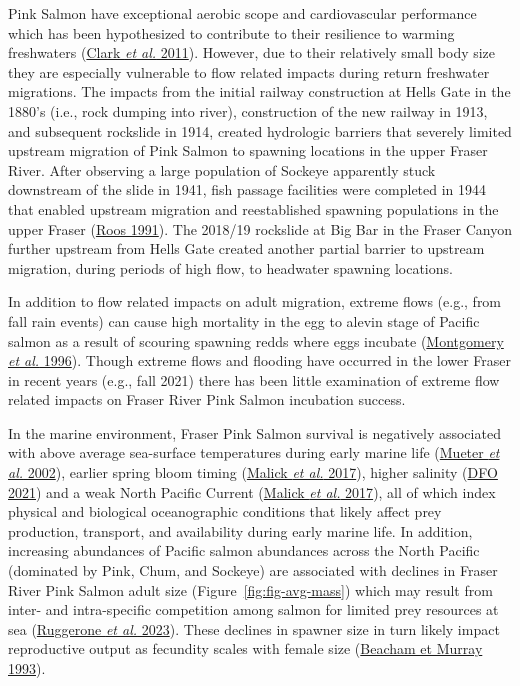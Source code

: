 \documentclass[french,11pt]{book}
\begin{document}
Pink Salmon have exceptional aerobic scope and cardiovascular performance which has been hypothesized to contribute to their resilience to warming freshwaters (\protect\hyperlink{ref-clarkExceptionalAerobicScope2011}{Clark \emph{et al.} 2011}). However, due to their relatively small body size they are especially vulnerable to flow related impacts during return freshwater migrations. The impacts from the initial railway construction at Hells Gate in the 1880's (i.e., rock dumping into river), construction of the new railway in 1913, and subsequent rockslide in 1914, created hydrologic barriers that severely limited upstream migration of Pink Salmon to spawning locations in the upper Fraser River. After observing a large population of Sockeye apparently stuck downstream of the slide in 1941, fish passage facilities were completed in 1944 that enabled upstream migration and reestablished spawning populations in the upper Fraser (\protect\hyperlink{ref-roosRestoringFraserRiver1991}{Roos 1991}). The 2018/19 rockslide at Big Bar in the Fraser Canyon further upstream from Hells Gate created another partial barrier to upstream migration, during periods of high flow, to headwater spawning locations.

In addition to flow related impacts on adult migration, extreme flows (e.g., from fall rain events) can cause high mortality in the egg to alevin stage of Pacific salmon as a result of scouring spawning redds where eggs incubate (\protect\hyperlink{ref-montgomeryStreambedScourEgg1996}{Montgomery \emph{et al.} 1996}). Though extreme flows and flooding have occurred in the lower Fraser in recent years (e.g., fall 2021) there has been little examination of extreme flow related impacts on Fraser River Pink Salmon incubation success.

In the marine environment, Fraser Pink Salmon survival is negatively associated with above average sea-surface temperatures during early marine life (\protect\hyperlink{ref-mueterOppositeEffectsOcean2002}{Mueter \emph{et al.} 2002}), earlier spring bloom timing (\protect\hyperlink{ref-malickEffectsNorthPacific2017}{Malick \emph{et al.} 2017}), higher salinity (\protect\hyperlink{ref-dfoPreseasonRunSize2021}{DFO 2021}) and a weak North Pacific Current (\protect\hyperlink{ref-malickEffectsNorthPacific2017}{Malick \emph{et al.} 2017}), all of which index physical and biological oceanographic conditions that likely affect prey production, transport, and availability during early marine life. In addition, increasing abundances of Pacific salmon abundances across the North Pacific (dominated by Pink, Chum, and Sockeye) are associated with declines in Fraser River Pink Salmon adult size (Figure~\ref{fig:fig-avg-mass}) which may result from inter- and intra-specific competition among salmon for limited prey resources at sea (\protect\hyperlink{ref-ruggeroneDiatomsKillerWhales2023}{Ruggerone \emph{et al.} 2023}). These declines in spawner size in turn likely impact reproductive output as fecundity scales with female size (\protect\hyperlink{ref-beachamFecundityEggSize1993}{Beacham et Murray 1993}).
\end{document}
